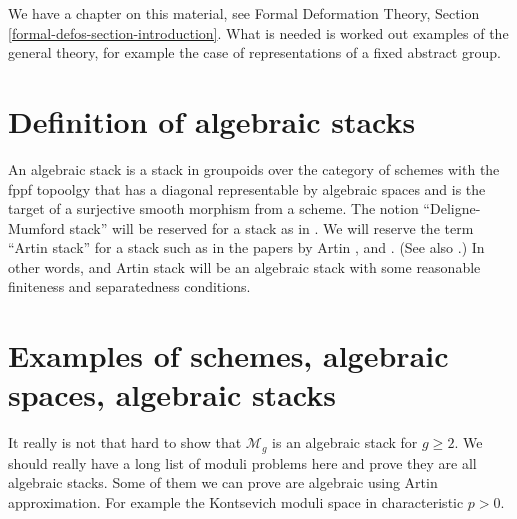 \noindent
We have a chapter on this material, see
Formal Deformation Theory, Section \ref{formal-defos-section-introduction}.
What is needed is worked out examples of the general theory, for example
the case of representations of a fixed abstract group.


\section{Definition of algebraic stacks}
\label{section-definition-algebraic-stacks}

\noindent
An algebraic stack is a stack in groupoids over the category of schemes
with the fppf topoolgy that has a diagonal representable by algebraic
spaces and is the target of a surjective smooth morphism from a scheme.
The notion ``Deligne-Mumford stack'' will be reserved for a stack as in
\cite{DM}. We will reserve the term ``Artin stack'' for
a stack such as in the papers by Artin \cite{ArtinI}, and \cite{ArtinVersal}.
(See also \cite{conrad-dejong}.) In other words, and Artin stack will be an
algebraic stack with some reasonable finiteness and separatedness conditions.


\section{Examples of schemes, algebraic spaces, algebraic stacks}
\label{section-examples-stacks}

\noindent
It really is not that hard to show that $\mathcal{M}_g$ is an algebraic
stack for $g\geq 2$. We should really have a long list of moduli problems
here and prove they are all algebraic stacks. Some of them we can
prove are algebraic using Artin approximation. For example the Kontsevich
moduli space in characteristic $p > 0$.

